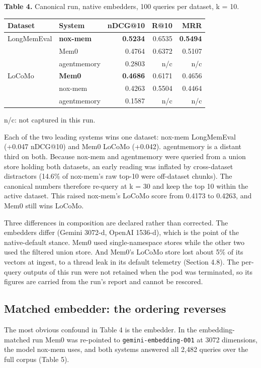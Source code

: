 \documentclass[a4paper,fleqn]{cas-sc}
\newcounter{none}  %
\begin{document}
\textbf{Table 4.} Canonical run, native embedders, 100 queries per dataset, k = 10.

{\def\LTcaptype{none} %
\begin{longtable}{@{}llrrr@{}}
\toprule\noalign{}
Dataset & System & nDCG@10 & R@10 & MRR \\
\midrule\noalign{}
\endhead
\bottomrule\noalign{}
\endlastfoot
LongMemEval & \textbf{nox-mem} & \textbf{0.5234} & 0.6535 & \textbf{0.5494} \\
& Mem0 & 0.4764 & 0.6372 & 0.5107 \\
& agentmemory & 0.2803 & n/c & n/c \\
LoCoMo & \textbf{Mem0} & \textbf{0.4686} & 0.6171 & 0.4656 \\
& nox-mem & 0.4263 & 0.5504 & 0.4464 \\
& agentmemory & 0.1587 & n/c & n/c \\
\end{longtable}
}

n/c: not captured in this run.

Each of the two leading systems wins one dataset: nox-mem LongMemEval (+0.047 nDCG@10) and Mem0 LoCoMo (+0.042). agentmemory is a distant third on both. Because nox-mem and agentmemory were queried from a union store holding both datasets, an early reading was inflated by cross-dataset distractors (14.6\% of nox-mem's raw top-10 were off-dataset chunks). The canonical numbers therefore re-query at k = 30 and keep the top 10 within the active dataset. This raised nox-mem's LoCoMo score from 0.4173 to 0.4263, and Mem0 still wins LoCoMo.

Three differences in composition are declared rather than corrected. The embedders differ (Gemini 3072-d, OpenAI 1536-d), which is the point of the native-default stance. Mem0 used single-namespace stores while the other two used the filtered union store. And Mem0's LoCoMo store lost about 5\% of its vectors at ingest, to a thread leak in its default telemetry (Section 4.8). The per-query outputs of this run were not retained when the pod was terminated, so its figures are carried from the run's report and cannot be rescored.

\subsection{Matched embedder: the ordering reverses}

The most obvious confound in Table 4 is the embedder. In the embedding-matched run Mem0 was re-pointed to \texttt{gemini-embedding-001} at 3072 dimensions, the model nox-mem uses, and both systems answered all 2,482 queries over the full corpus (Table 5).
\end{document}
